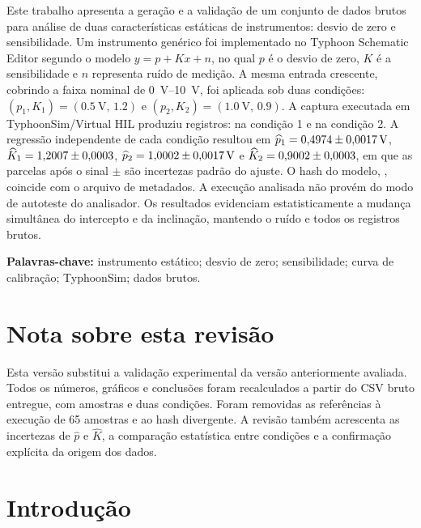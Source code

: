 \documentclass[12pt,a4paper]{article}
\begin{document}
Este trabalho apresenta a geração e a validação de um conjunto de dados brutos para análise de duas características estáticas de instrumentos: desvio de zero e sensibilidade. Um instrumento genérico foi implementado no Typhoon Schematic Editor segundo o modelo $y=p+Kx+n$, no qual $p$ é o desvio de zero, $K$ é a sensibilidade e $n$ representa ruído de medição. A mesma entrada crescente, cobrindo a faixa nominal de \SIrange{0}{10}{\volt}, foi aplicada sob duas condições: $(p_1,K_1)=(\SI{0.5}{\volt},\,\num{1.2})$ e $(p_2,K_2)=(\SI{1.0}{\volt},\,\num{0.9})$. A captura executada em TyphoonSim/Virtual HIL produziu \TotalAmostras{} registros: \AmostrasUm{} na condição 1 e \AmostrasDois{} na condição 2. A regressão independente de cada condição resultou em $\widehat p_1=0{,}4974\pm0{,}0017\,\si{\volt}$, $\widehat K_1=1{,}2007\pm0{,}0003$, $\widehat p_2=1{,}0002\pm0{,}0017\,\si{\volt}$ e $\widehat K_2=0{,}9002\pm0{,}0003$, em que as parcelas após o sinal $\pm$ são incertezas padrão do ajuste. O hash do modelo, \HashModeloCurto, coincide com o arquivo de metadados. A execução analisada não provém do modo de autoteste do analisador. Os resultados evidenciam estatisticamente a mudança simultânea do intercepto e da inclinação, mantendo o ruído e todos os registros brutos.

\noindent\textbf{Palavras-chave:} instrumento estático; desvio de zero; sensibilidade; curva de calibração; TyphoonSim; dados brutos.

\section*{Nota sobre esta revisão}

Esta versão substitui a validação experimental da versão anteriormente avaliada. Todos os números, gráficos e conclusões foram recalculados a partir do CSV bruto entregue, com \TotalAmostras{} amostras e duas condições. Foram removidas as referências à execução de 65 amostras e ao hash divergente. A revisão também acrescenta as incertezas de $\widehat p$ e $\widehat K$, a comparação estatística entre condições e a confirmação explícita da origem dos dados.

\clearpage
\begingroup
\small
\tableofcontents
\endgroup
\clearpage
\listoffigures
\clearpage
\listoftables

\clearpage
{}

\section{Introdução}
\end{document}
